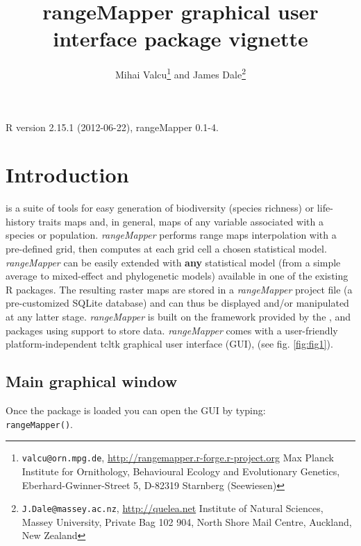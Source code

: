\documentclass[ a4paper ]{article}
\begin{document}
\title{rangeMapper graphical user interface package vignette}
\author{
Mihai Valcu\footnote{
	\texttt{valcu@orn.mpg.de},
	\url{http://rangemapper.r-forge.r-project.org}
	Max Planck Institute for Ornithology, 
	Behavioural Ecology and Evolutionary Genetics, 
	Eberhard-Gwinner-Street 5, D-82319 Starnberg (Seewiesen)} and 
James Dale\footnote{
	\texttt{J.Dale@massey.ac.nz},
	\url{http://quelea.net}
	Institute of Natural Sciences,
	Massey University,
	Private Bag 102 904,
	North Shore Mail Centre,
	Auckland, New Zealand 
}
}

\maketitle
R version 2.15.1 (2012-06-22),
rangeMapper 0.1-4.


\section{Introduction}
	\cite{rangeMapper} is a suite of tools for easy generation of biodiversity (species richness) or life-history traits maps and, in general, maps of any variable associated with a species or population. 
	\emph{rangeMapper} performs range maps interpolation with a pre-defined grid, then computes at each grid cell a chosen statistical model. 
	\emph{rangeMapper} can be easily extended with {\bf any} statistical model (from a simple average to mixed-effect and phylogenetic models) available in one of the existing R packages.
	 The resulting raster maps are stored in a \emph{rangeMapper} project file (a pre-customized SQLite database) and 
	 can thus be displayed and/or manipulated at any latter stage.
	\emph{rangeMapper} is built on the framework provided by the \cite{sp}, \cite{maptools} and \cite{rgdal} packages using \cite{sqlite} support to store data.
	\emph{rangeMapper} comes with a user-friendly platform-independent tcltk graphical user interface (GUI), (see fig. \ref{fig:fig1}). 

\subsection{Main graphical window}
Once the package is loaded you can open the GUI by typing:\\
\texttt{rangeMapper()}.
\end{document}
